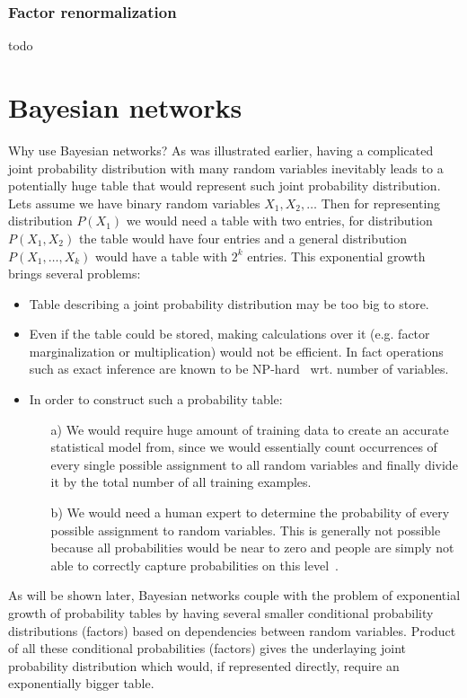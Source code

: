 \documentclass[english,cover]{fitthesis} %
\newcommand{\todo}[1]{{\color{red} #1}}
\begin{document}
\subsubsection{Factor renormalization}
\todo{todo}




\section{Bayesian networks}
Why use Bayesian networks? As was illustrated earlier, having a complicated joint probability distribution with many random variables inevitably leads to a potentially huge table that would represent such joint probability distribution. Lets assume we have binary random variables $X_1, X_2, \dots$ Then for representing distribution $P(X_1)$ we would need a table with two entries, for distribution $P(X_1, X_2)$ the table would have four entries and a general distribution $P(X_1, \dots, X_k)$ would have a table with $2^k$ entries. This exponential growth brings several problems:
\begin{itemize}
    \item Table describing a joint probability distribution may be too big to store.
    \item Even if the table could be stored, making calculations over it (e.g. factor marginalization or multiplication) would not be efficient. In fact operations such as exact inference are known to be NP-hard~\cite{pgm} wrt. number of variables.
    \item In order to construct such a probability table:
    \begin{enumerate}
        \item[a)] We would require huge amount of training data to create an accurate statistical model from, since we would essentially count occurrences of every single possible assignment to all random variables and finally divide it by the total number of all training examples.
        \item[b)] We would need a human expert to determine the probability of every possible assignment to random variables. This is generally not possible because all probabilities would be near to zero and people are simply not able to correctly capture probabilities on this level~\cite{pgm}.
    \end{enumerate}
\end{itemize}

As will be shown later, Bayesian networks couple with the problem of exponential growth of probability tables by having several smaller conditional probability distributions (factors) based on dependencies between random variables. Product of all these conditional probabilities (factors) gives the underlaying joint probability distribution which would, if represented directly, require an exponentially bigger table.
\end{document}
